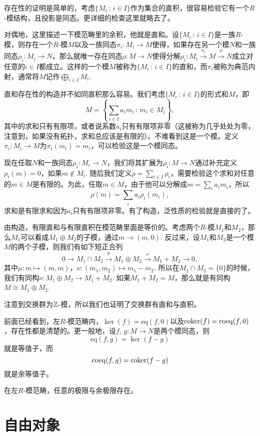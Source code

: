 存在性的证明是简单的，考虑$\{M_i\,:\, i\in I\}$作为集合的直积，很容易检验它有一个$R$-模结构，且投影是同态。更详细的检查这里就略去了。

\para 对偶地，这里描述一下模范畴里的余积，他就是直和。设$\{M_i\,:\, i\in I\}$是一族$R$-模，则存在一个$R$-模$M$以及一族同态$\pi_i:M_i\to M$使得，如果存在另一个模$N$和一族同态$\rho_i:M_i\to N$，那么就唯一存在同态$\rho:M\to N$使得分解$\rho_i:M_i\xrightarrow{\pi_i} M \xrightarrow{\rho} N$成立对任意的$i\in I$都成立。这样的一个模$M$被称为$\{M_i\,:\, i\in I\}$的直和，而$\pi_i$被称为典范内射，通常将$M$记作$\bigoplus_{i\in I}M_i$. 

直和存在性的构造并不如同直积那么容易。我们考虑$\{M_i\,:\, i\in I\}$的形式和$M$，即
\[
	M=\left\{\sum_{i\in I} a_i m_i\,:\, m_i\in M_i\right\},
\]
其中的求和只有有限项，或者说系数$a_i$只有有限项非零（这被称为几乎处处为零，注意到，如果没有拓扑，求和总应该是有限的）。不难看到这是一个模。定义$\pi_i:M_i\to M$为$\pi_i(m_i)=m_i$，可以检验这是一个模同态。

现在任取$N$和一族同态$\rho_i:M_i\to N$，我们将其扩展为$\rho_i:M\to N$通过补充定义$\rho_i(m)=0$，如果$m\notin M_i$. 随后我们定义$\rho = \sum_{i\in I} \rho_i$，需要检验这个求和对任意的$m\in M$是有限的。为此，任取$m\in M$，由于他可以分解成$m=\sum_i a_i m_i$，所以
\[
	\rho(m)=\sum_i a_i \rho_i(m_i),
\]
求和是有限求和因为$a_i$只有有限项非零。有了构造，泛性质的检验就是直接的了。

由构造，有限直和与有限直积在模范畴里面是等价的。考虑两个$R$-模$M_1$和$M_2$，那么$M_1$可以看成$M_1\oplus M_2$的子模，通过$m\to (m,0)$. 反过来，设$M_1$和$M_2$是一个模$M$的两个子模，则我们有如下短正合列
\[
	0\to M_1\cap M_2 \xrightarrow{\mu} M_1\oplus M_2\xrightarrow{\nu} M_1+M_2\to 0,
\]
其中$\mu:m\mapsto (m,m)$，$\nu:(m_1,m_2)\mapsto m_1-m_2$. 所以在$M_1\cap M_2=\{0\}$的时候，我们有同构$\nu: M_1\oplus M_2\to M_1+M_2$. 如果$M_1+M_2=M$，那么就是有同构$M\cong M_1\oplus M_2$.

\para 注意到交换群为$\mathbb{Z}$-模，所以我们也证明了交换群有直和与直积。

\para 前面已经看到，左$R$-模范畴内，$\ker(f)=\mathrm{eq}(f,0)$以及$\operatorname{coker}(f)=\mathrm{coeq}(f,0)$，存在性都是清楚的。更一般地，设$f$, $g:M\to N$是两个模同态，则
\[
	\mathrm{eq}(f,g)=\ker(f-g)
\]
就是等值子，而
\[
	\mathrm{coeq}(f,g)=\operatorname{coker} (f-g)
\]
就是余等值子。

\theo 在左$R$-模范畴，任意的极限与余极限存在。 \notprove

\section{自由对象}

